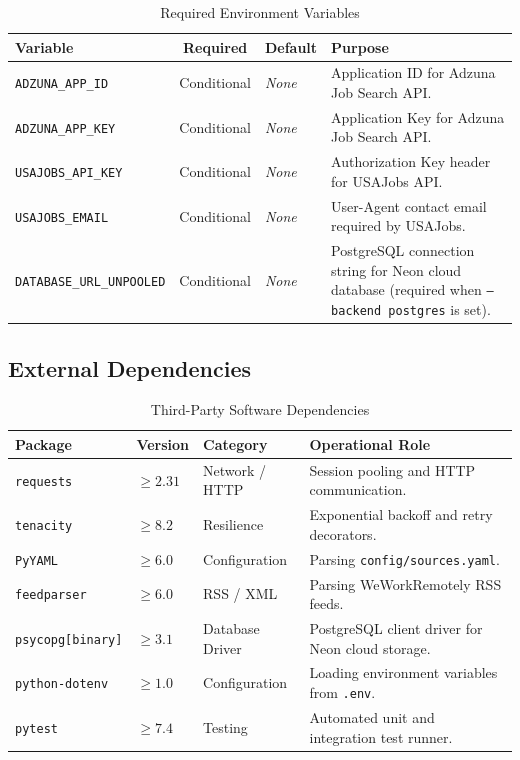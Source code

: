 \documentclass[10pt,letterpaper]{article}
\begin{document}
\begin{table}[htbp]
\centering
\small
\begin{tabularx}{\textwidth}{lcp{3.2cm}X}
\toprule
\textbf{Variable} & \textbf{Required} & \textbf{Default} & \textbf{Purpose} \\
\midrule
\texttt{ADZUNA\_APP\_ID} & Conditional & \emph{None} & Application ID for Adzuna Job Search API. \\
\addlinespace
\texttt{ADZUNA\_APP\_KEY} & Conditional & \emph{None} & Application Key for Adzuna Job Search API. \\
\addlinespace
\texttt{USAJOBS\_API\_KEY} & Conditional & \emph{None} & Authorization Key header for USAJobs API. \\
\addlinespace
\texttt{USAJOBS\_EMAIL} & Conditional & \emph{None} & User-Agent contact email required by USAJobs. \\
\addlinespace
\texttt{DATABASE\_URL\_UNPOOLED} & Conditional & \emph{None} & PostgreSQL connection string for Neon cloud database (required when \texttt{--backend postgres} is set). \\
\bottomrule
\end{tabularx}
\caption{Required Environment Variables}
\end{table}

\subsection{External Dependencies}

\begin{table}[htbp]
\centering
\small
\begin{tabularx}{\textwidth}{llp{3.5cm}X}
\toprule
\textbf{Package} & \textbf{Version} & \textbf{Category} & \textbf{Operational Role} \\
\midrule
\texttt{requests} & $\ge 2.31$ & Network / HTTP & Session pooling and HTTP communication. \\
\texttt{tenacity} & $\ge 8.2$ & Resilience & Exponential backoff and retry decorators. \\
\texttt{PyYAML} & $\ge 6.0$ & Configuration & Parsing \texttt{config/sources.yaml}. \\
\texttt{feedparser} & $\ge 6.0$ & RSS / XML & Parsing WeWorkRemotely RSS feeds. \\
\texttt{psycopg[binary]} & $\ge 3.1$ & Database Driver & PostgreSQL client driver for Neon cloud storage. \\
\texttt{python-dotenv} & $\ge 1.0$ & Configuration & Loading environment variables from \texttt{.env}. \\
\texttt{pytest} & $\ge 7.4$ & Testing & Automated unit and integration test runner. \\
\bottomrule
\end{tabularx}
\caption{Third-Party Software Dependencies}
\end{table}
\end{document}

